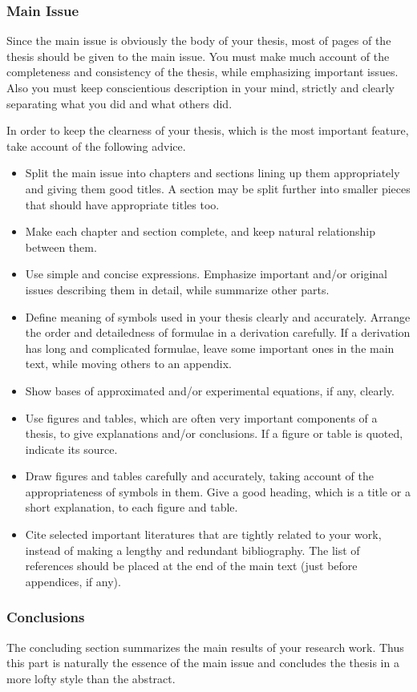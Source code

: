 \documentclass[master,english]{kuisthesis}
\begin{document}
\subsubsection{Main Issue}\label{subsubsec-main}
Since the main issue is obviously the body of your thesis, most of pages of
the thesis should be given to the main issue.  You must make much account of
the completeness and consistency of the thesis, while emphasizing important
issues.  Also you must keep conscientious description in your mind, strictly
and clearly separating what you did and what others did.

In order to keep the clearness of your thesis, which is the most important
feature, take account of the following advice.
\begin{itemize}%
\item
Split the main issue into chapters and sections lining up them appropriately
and giving them good titles.  A section may be split further into smaller
pieces that should have appropriate titles too.
\item
Make each chapter and section complete, and keep natural relationship
between them.
\item
Use simple and concise expressions.  Emphasize important and/or original
issues describing them in detail, while summarize other parts.
\item
Define meaning of symbols used in your thesis clearly and accurately.
Arrange the order and detailedness of formulae in a derivation carefully.
If a derivation has long and complicated formulae, leave some important ones
in the main text, while moving others to an appendix.
\item
Show bases of approximated and/or experimental equations, if any, clearly.
\item
Use figures and tables, which are often very important components of a
thesis, to give explanations and/or conclusions.  If a figure or table is
quoted, indicate its source.
\item
Draw figures and tables carefully and accurately, taking account of the
appropriateness of symbols in them.  Give a good heading, which is a title
or a short explanation, to each figure and table.
\item
Cite selected important literatures that are tightly related to your work,
instead of making a lengthy and redundant bibliography.  The list of
references should be placed at the end of the main text (just before
appendices, if any).
\end{itemize}%

\subsubsection{Conclusions}\label{subsubsec-conclusion}
The concluding section summarizes the main results of your research work.
Thus this part is naturally the essence of the main issue and concludes the
thesis in a more lofty style than the abstract.
\end{document}
